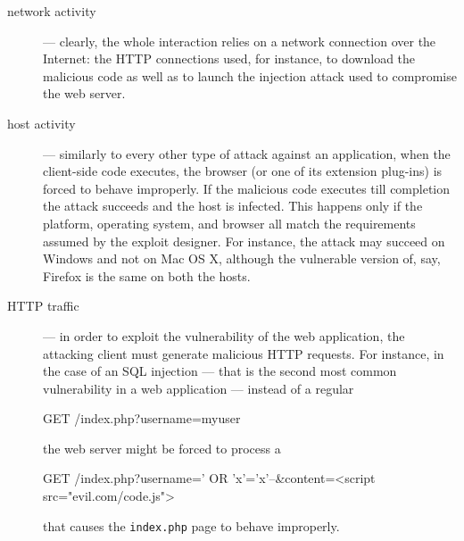 \documentclass[12pt]{article}
\theoremstyle{definition}
\begin{document}
		\begin{description}
			\item[network activity] --- clearly, the whole interaction relies on a
			network connection over the Internet: the \ac{HTTP} connections
			used, for instance, to download the malicious code as well as to
			launch the injection attack used to compromise the web server.
			\item[host activity] --- similarly to every other type of attack
			against an application, when the client-side code executes, the
			browser (or one of its extension plug-ins) is forced to behave
			improperly. If the malicious code executes till completion the
			attack succeeds and the host is infected. This happens only if the
			platform, operating system, and browser all match the requirements
			assumed by the exploit designer. For instance, the attack may
			succeed on \textsf{Windows} and not on \textsf{Mac OS X}, although
			the vulnerable version of, say, \textsf{Firefox} is the same on both
			the hosts.
			\item[HTTP traffic] --- in order to exploit the vulnerability of the
			web application, the attacking client must generate malicious
			HTTP requests. For instance, in the case of an SQL
			injection --- that is the second most common vulnerability in a web
			application --- instead of a regular
			
			\begin{logs}
GET /index.php?username=myuser 
			\end{logs}
			
			\noindent the web server might be forced to process a
			
			\begin{logs}
GET /index.php?username=' OR 'x'='x'--\&content=<script
src="evil.com/code.js">
			\end{logs}
			
			\noindent that causes the \texttt{index.php} page to behave
			improperly.
		\end{description}
		
\end{document}
